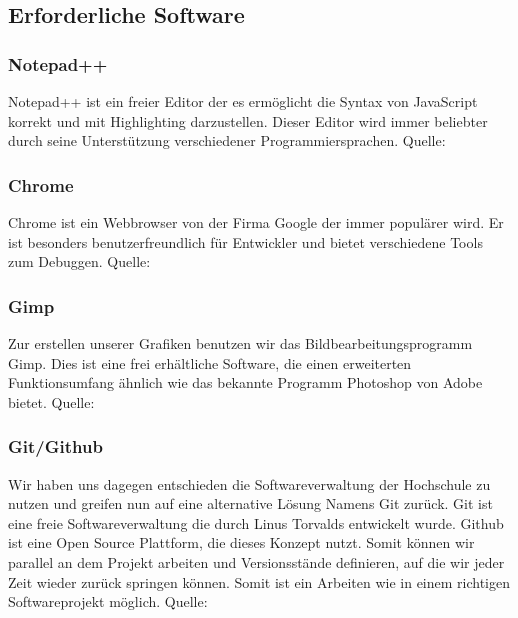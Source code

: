 \subsection{Erforderliche Software}
\subsubsection{Notepad++}
Notepad++ ist ein freier Editor der es ermöglicht die Syntax von JavaScript korrekt und mit Highlighting darzustellen. Dieser Editor wird immer beliebter durch seine Unterstützung verschiedener Programmiersprachen. Quelle: \cite{notepad}
\subsubsection{Chrome}
Chrome ist ein Webbrowser von der Firma Google der immer populärer wird. Er ist besonders benutzerfreundlich für Entwickler und bietet verschiedene Tools zum Debuggen. Quelle: \cite{chrome}
\subsubsection{Gimp}
Zur erstellen unserer Grafiken benutzen wir das Bildbearbeitungsprogramm Gimp. Dies ist eine frei erhältliche Software, die einen erweiterten Funktionsumfang ähnlich wie das bekannte Programm Photoshop von Adobe bietet. Quelle: \cite{gimp}
\subsubsection{Git/Github}
Wir haben uns dagegen entschieden die Softwareverwaltung der Hochschule zu nutzen und greifen nun auf eine alternative Lösung Namens Git zurück. Git ist eine freie Softwareverwaltung die durch Linus Torvalds entwickelt wurde. Github ist eine Open Source Plattform, die dieses Konzept nutzt. Somit können wir parallel an dem Projekt arbeiten und Versionsstände definieren, auf die wir jeder Zeit wieder zurück springen können. Somit ist ein Arbeiten wie in einem richtigen Softwareprojekt möglich. Quelle: \cite{git}
